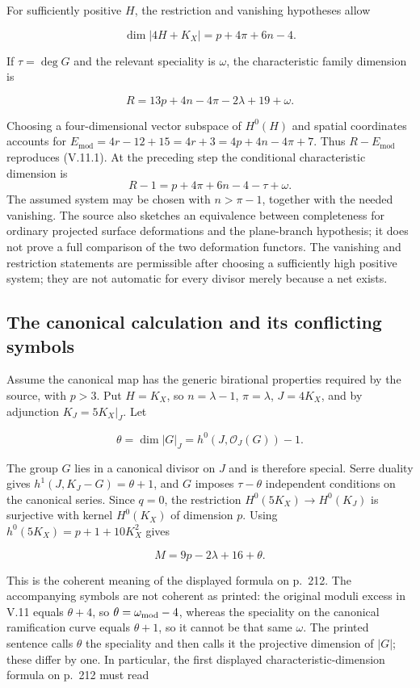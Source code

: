 For sufficiently positive \(H\), the restriction and vanishing hypotheses allow

\[
\dim|4H+K_X|=p+4\pi+6n-4.
\]

If \(\tau=\deg G\) and the relevant speciality is \(\omega\), the characteristic family dimension is

\[
R=13p+4n-4\pi-2\lambda+19+\omega.
\]

Choosing a four-dimensional vector subspace of \(H^0(H)\) and spatial coordinates accounts for \(E_{\mathrm{mod}}=4r-12+15=4r+3=4p+4n-4\pi+7\). Thus \(R-E_{\mathrm{mod}}\) reproduces (V.11.1). At the preceding step the conditional characteristic dimension is \[
R-1=p+4\pi+6n-4-\tau+\omega.
\] The assumed system may be chosen with \(n>\pi-1\), together with the needed vanishing. The source also sketches an equivalence between completeness for ordinary projected surface deformations and the plane-branch hypothesis; it does not prove a full comparison of the two deformation functors. The vanishing and restriction statements are permissible after choosing a sufficiently high positive system; they are not automatic for every divisor merely because a net exists.

\subsection{The canonical calculation and its conflicting symbols}

Assume the canonical map has the generic birational properties required by the source, with \(p>3\). Put \(H=K_X\), so \(n=\lambda-1\), \(\pi=\lambda\), \(J=4K_X\), and by adjunction \(K_J=5K_X|_J\). Let

\[
\theta=\dim|G|_J=h^0(J,\mathcal O_J(G))-1.
\]

The group \(G\) lies in a canonical divisor on \(J\) and is therefore special. Serre duality gives \(h^1(J,K_J-G)=\theta+1\), and \(G\) imposes \(\tau-\theta\) independent conditions on the canonical series. Since \(q=0\), the restriction \(H^0(5K_X)\to H^0(K_J)\) is surjective with kernel \(H^0(K_X)\) of dimension \(p\). Using \(h^0(5K_X)=p+1+10K_X^2\) gives

\[
M=9p-2\lambda+16+\theta. \tag{V.13.1}
\]

This is the coherent meaning of the displayed formula on p.~212. The accompanying symbols are not coherent as printed: the original moduli excess in V.11 equals \(\theta+4\), so \(\theta=\omega_{\rm mod}-4\), whereas the speciality on the canonical ramification curve equals \(\theta+1\), so it cannot be that same \(\omega\). The printed sentence calls \(\theta\) the speciality and then calls it the projective dimension of \(|G|\); these differ by one. In particular, the first displayed characteristic-dimension formula on p.~212 must read

